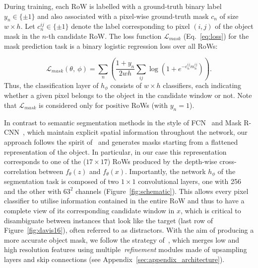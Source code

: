During training, each RoW is labelled with a ground-truth binary label $y_{n} \in \{\pm 1\}$ and also associated with a pixel-wise ground-truth mask $c_n$ of size $w{\times}h$.
Let $c^{ij}_{n} \in \{\pm 1\}$ denote the label corresponding to pixel $(i,j)$ of the object mask in the $n$-th candidate RoW.
The loss function $\mathcal{L}_{mask}$ (Eq.~\ref{eq:loss}) for the mask prediction task is a binary logistic regression loss over all RoWs:

\begin{equation}\label{eq:loss}
		\mathcal{L}_{mask}(\theta,~\phi) =  \sum_{n} (\frac{1+y_{n}}{2wh}\sum_{ij} \log (1 + e^{-c^{ij}_{n}m_{n}^{ij}}
		)).
\end{equation}
Thus, the classification layer of $h_{\phi}$ consists of $w{\times}h$ classifiers, each indicating whether a given pixel belongs to the object in the candidate window or not.
Note that $\mathcal{L}_{mask}$ is considered only for positive RoWs (\ie with $y_{n}=1$).


In contrast to semantic segmentation methods in the style of FCN~\cite{long2015fully} and Mask R-CNN~\cite{maskrcnn}, which maintain explicit spatial information throughout the network, our approach follows the spirit of~\cite{DeepMask,SharpMask} and generates masks starting from a flattened representation of the object.
In particular, in our case this representation corresponds to one of the ($17{\times}17$) RoWs produced by the depth-wise cross-correlation between $f_\theta(z)$ and $f_\theta(x)$.
Importantly, the network $h_\phi$ of the segmentation task is composed of two $1{\times}1$ convolutional layers, one with 256 and the other with $63^2$ channels (Figure~\ref{fig:schematic}).
This allows every pixel classifier to utilise information contained in the entire RoW and thus to have a complete view of its corresponding candidate window in $x$, which is critical to disambiguate between instances that look like the target (\eg last row of Figure~\ref{fig:davis16}), often referred to as distractors.
With the aim of producing a more accurate object mask, we follow the strategy of~\cite{SharpMask}, which merges low and high resolution features using multiple~\textit{refinement} modules made of upsampling layers and skip connections (see Appendix~\ref{sec:appendix_architecture}).

